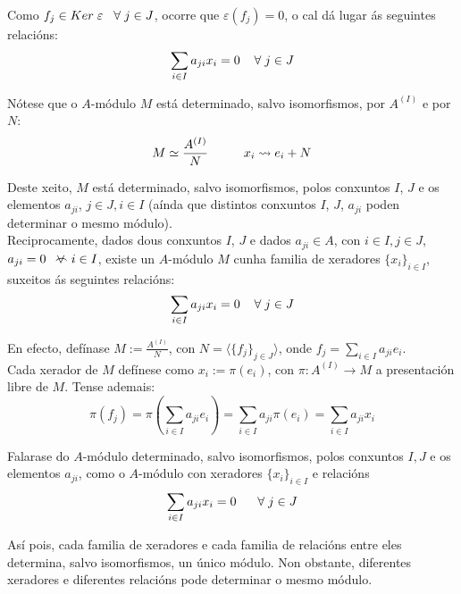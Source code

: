 \documentclass[twoside]{report}
\newcommand{\almostall}{\mathrel{\vee\mkern-19mu\frown}} %
\theoremstyle{mystyle}
\begin{document}
\noindent Como $f_{j} \in Ker \hspace{1mm} \varepsilon \hspace{3mm} \forall \hspace{1mm} j \in J$, ocorre que $\varepsilon(f_{j}) = 0$, o cal dá lugar ás seguintes relacións:
$$\displaystyle \sum_{i \in I} a_{ji}x_{i} = 0 \hspace{4mm} \forall \hspace{1mm} j \in J$$

\noindent Nótese que o $A$-módulo $M$ está determinado, salvo isomorfismos, por $A^{(I)}$ e por $N$:
$$M \simeq \displaystyle \frac{A^{(I)}}{N} \hspace{10mm} x_{i} \leadsto e_{i} + N$$

\noindent Deste xeito, $M$ está determinado, salvo isomorfismos, polos conxuntos $I$, $J$ e os elementos $a_{ji}$, $j \in J, i \in I$ (aínda que distintos conxuntos $I$, $J$, $a_{ji}$ poden determinar o mesmo módulo).\\

\noindent Reciprocamente, dados dous conxuntos $I$, $J$ e dados $a_{ji} \in A$, con $i \in I, j \in J$, $a_{ji} = 0 \hspace{2mm} \almostall i \in I$, existe un $A$-módulo $M$ cunha familia de xeradores $\{x_{i}\}_{i \in I}$, suxeitos ás seguintes relacións:
$$\displaystyle \sum_{i \in I} a_{ji}x_{i} = 0 \hspace{4mm} \forall \hspace{1mm} j \in J$$

\noindent En efecto, defínase $M := \displaystyle \frac{A^{(I)}}{N}$, con $N = \langle \{f_{j}\}_{j \in J} \rangle$, onde $f_{j} = \underset{i \in I}{\sum} a_{ji}e_{i}$.\\

\noindent Cada xerador de $M$ defínese como $x_{i} := \pi(e_{i})$, con $\pi: A^{(I)} \longrightarrow M$ a presentación libre de $M$. Tense ademais:
$$\pi(f_{j}) = \pi \left( \displaystyle \sum_{i \in I} a_{ji}e_{i}\right) = \displaystyle \sum_{i \in I} a_{ji} \pi(e_{i}) = \displaystyle \sum_{i \in I} a_{ji}x_{i}$$

\noindent Falarase do $A$-módulo determinado, salvo isomorfismos, polos conxuntos $I,J$ e os elementos $a_{ji}$, como o $A$-módulo con xeradores $\{x_{i}\}_{i \in I}$ e relacións
$$\displaystyle \sum_{i \in I} a_{ji}x_{i} = 0 \hspace{6mm} \forall \hspace{1mm} j \in J$$

\noindent Así pois, cada familia de xeradores e cada familia de relacións entre eles determina, salvo isomorfismos, un único módulo. Non obstante, diferentes xeradores e diferentes relacións pode determinar o mesmo módulo.\\
\end{document}
